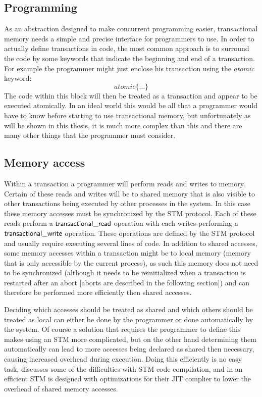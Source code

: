 \subsection{Programming}
As an abstraction designed to make concurrent programming easier, transactional memory needs a
simple and precise interface for programmers to use.
In order to actually define transactions in code, the most common
approach is to surround the code by some keywords that indicate the beginning and end of a transaction.
For example the programmer might just enclose his transaction using the \emph{atomic} keyword:
$$atomic\{\ldots\}$$
The code within this block will then be treated as a transaction and appear to be executed atomically.
In an ideal world this would be all that a programmer would have to know before starting to use
transactional memory, but unfortunately as will be shown in this thesis, it is much more complex than this
and there are many other things that the programmer must consider.


\subsection{Memory access}
Within a transaction a programmer will perform reads and writes to memory.
Certain of these reads and writes will be to shared memory that is also visible to other transactions
being executed by other processes in the system.
In this case these memory accesses must be synchronized by the STM protocol.
Each of these reads perform a $\lit{transactional\_read}$ operation with each writes performing a $\lit{transactional\_write}$ operation.
These operations are defined by the STM protocol and usually require executing several lines of code.
In addition to shared accesses, some memory accesses within a transaction might be to local memory
(memory that is only accessible by the current process),
as such this memory does not need to be synchronized (although it needs to be reinitialized when a transaction is
restarted after an abort [aborts are described in the following section]) and can therefore be performed more efficiently then shared accesses.

Deciding which accesses should be treated as shared and which others should be treated as local
can either be done by the programmer or done automatically by the system.
Of course a solution that requires the programmer to define this makes using an STM more complicated, but on
the other hand determining them automatically can lead to more accesses being declared as shared then necessary,
causing increased overhead during execution.
Doing this efficiently is no easy task, \cite{DFGG11} discusses some of the difficulties with STM code compilation,
and in \cite{1133985} an efficient STM is designed with optimizations for their JIT complier to lower the overhead
of shared memory accesses.

